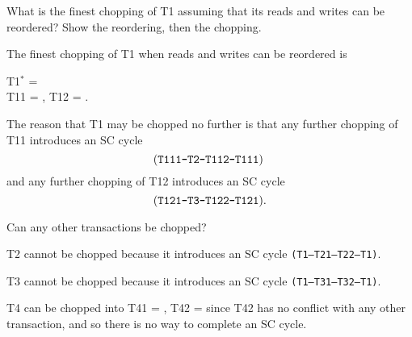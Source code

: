 \documentclass[letterpaper]{article}%
\begin{document}
\begin{enumerate}[1.]
\begin{enumerate}[a.]
        \begin{problemcopy}
        \item What is the finest chopping of T1 assuming that its reads and
          writes can be reordered? Show the reordering, then the chopping.
        \end{problemcopy}

        The finest chopping of T1 when reads and writes can be reordered is

        \begin{center}
          T1$^*$ =  \\
          \vspace{2mm}
          T11 = \hspace{1mm},\hspace{2mm}
          T12 = \hspace{1mm}.
        \end{center}
        \vspace{1em}

        The reason that T1 may be chopped no further is that any further
        chopping of T11 introduces an SC cycle
        \begin{equation*}
          \text{(\texttt{T111--T2--T112--T111})\phantom{.}}
        \end{equation*}
        and any further chopping of T12 introduces an SC cycle
        \begin{equation*}
          \text{(\texttt{T121--T3--T122--T121}).}
        \end{equation*}

        \begin{problemcopy}
        \item Can any other transactions be chopped?
        \end{problemcopy}

        T2 cannot be chopped because it introduces an SC cycle \texttt{(T1--T21--T22--T1)}.
        \vspace{0.5em}

        T3 cannot be chopped because it introduces an SC cycle \texttt{(T1--T31--T32--T1)}.
        \vspace{0.5em}

        T4 can be chopped into
        T41 = \hspace{1mm},\hspace{2mm}
        T42 = \hspace{2mm}\vspace{1mm}
        since T42 has no conflict with any other transaction, and so there is
        no way to complete an SC cycle.

    \end{enumerate}

\end{enumerate}
\end{document}
